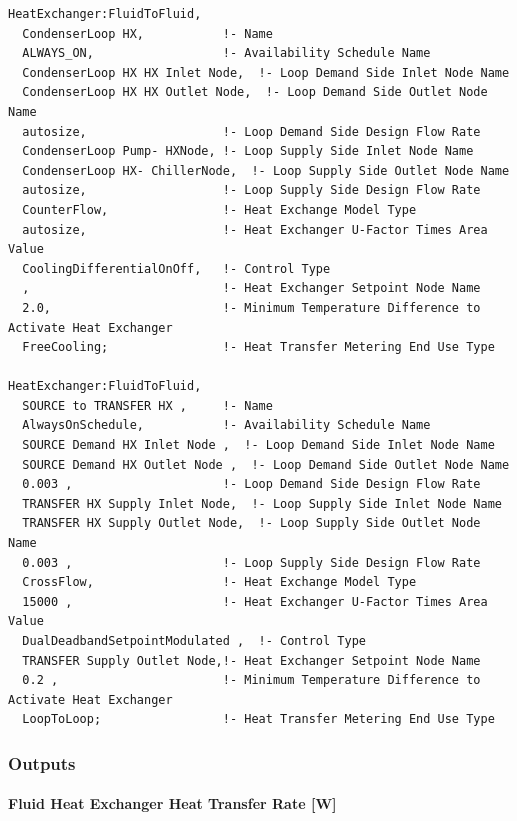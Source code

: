 \begin{lstlisting}
HeatExchanger:FluidToFluid,
  CondenserLoop HX,           !- Name
  ALWAYS_ON,                  !- Availability Schedule Name
  CondenserLoop HX HX Inlet Node,  !- Loop Demand Side Inlet Node Name
  CondenserLoop HX HX Outlet Node,  !- Loop Demand Side Outlet Node Name
  autosize,                   !- Loop Demand Side Design Flow Rate
  CondenserLoop Pump- HXNode, !- Loop Supply Side Inlet Node Name
  CondenserLoop HX- ChillerNode,  !- Loop Supply Side Outlet Node Name
  autosize,                   !- Loop Supply Side Design Flow Rate
  CounterFlow,                !- Heat Exchange Model Type
  autosize,                   !- Heat Exchanger U-Factor Times Area Value
  CoolingDifferentialOnOff,   !- Control Type
  ,                           !- Heat Exchanger Setpoint Node Name
  2.0,                        !- Minimum Temperature Difference to Activate Heat Exchanger
  FreeCooling;                !- Heat Transfer Metering End Use Type

HeatExchanger:FluidToFluid,
  SOURCE to TRANSFER HX ,     !- Name
  AlwaysOnSchedule,           !- Availability Schedule Name
  SOURCE Demand HX Inlet Node ,  !- Loop Demand Side Inlet Node Name
  SOURCE Demand HX Outlet Node ,  !- Loop Demand Side Outlet Node Name
  0.003 ,                     !- Loop Demand Side Design Flow Rate
  TRANSFER HX Supply Inlet Node,  !- Loop Supply Side Inlet Node Name
  TRANSFER HX Supply Outlet Node,  !- Loop Supply Side Outlet Node Name
  0.003 ,                     !- Loop Supply Side Design Flow Rate
  CrossFlow,                  !- Heat Exchange Model Type
  15000 ,                     !- Heat Exchanger U-Factor Times Area Value
  DualDeadbandSetpointModulated ,  !- Control Type
  TRANSFER Supply Outlet Node,!- Heat Exchanger Setpoint Node Name
  0.2 ,                       !- Minimum Temperature Difference to Activate Heat Exchanger
  LoopToLoop;                 !- Heat Transfer Metering End Use Type
\end{lstlisting}

\subsubsection{Outputs}\label{outputs-15}

\paragraph{Fluid Heat Exchanger Heat Transfer Rate {[}W{]}}\label{fluid-heat-exchanger-heat-transfer-rate-w}

